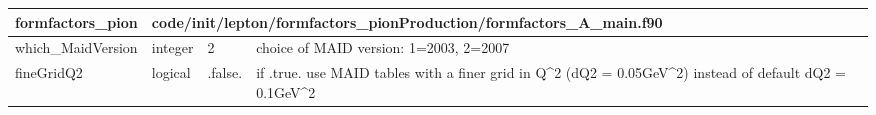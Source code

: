 \documentclass{article}
\begin{document}
\begin{longtable}{llll}
\toprule
\textbf{\large{formfactors\_pion}} & \multicolumn{3}{l}{\footnotesize{code/init/lepton/formfactors\_pionProduction/formfactors\_A\_main.f90}}\\*
\midrule
\endfirsthead
\midrule
\endhead
which\_MaidVersion & \begin{minipage}[t]{2cm}integer\end{minipage} & \begin{minipage}[t]{2cm}2\end{minipage} & \begin{minipage}[t]{12cm}choice of MAID version:  1=2003, 2=2007\end{minipage}\\*
\midrule
fineGridQ2 & \begin{minipage}[t]{2cm}logical\end{minipage} & \begin{minipage}[t]{2cm}.false.\end{minipage} & \begin{minipage}[t]{12cm}if .true. use MAID tables with a finer grid in Q\^{}2 (dQ2 = 0.05GeV\^{}2) instead of default dQ2 = 0.1GeV\^{}2\end{minipage}\\*
\bottomrule
\end{longtable}
{ }



\end{document}
